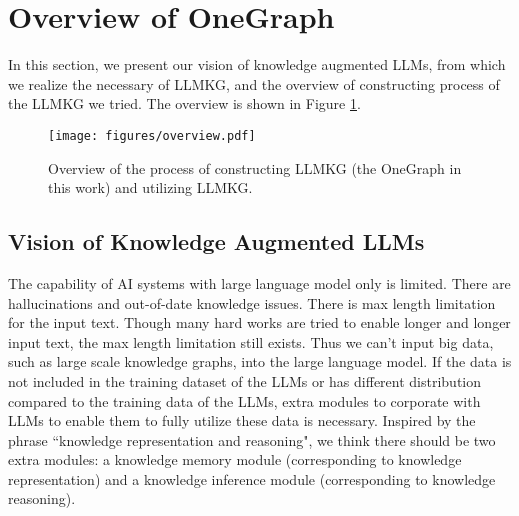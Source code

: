 \section{Overview of OneGraph}
In this section, we present our vision of knowledge augmented LLMs, from which we realize the necessary of LLMKG,  and the overview of constructing process of the LLMKG we tried. The overview is shown in Figure \ref{fig:overview}. 

\begin{figure}
    \centering
    \texttt{[image: figures/overview.pdf]}
    \caption{Overview of the process of constructing LLMKG (the OneGraph in this work) and utilizing LLMKG.}
    \label{fig:overview}
\end{figure}

\subsection{Vision of Knowledge Augmented LLMs}
The capability of AI systems with large language model only is limited. There are hallucinations and  out-of-date knowledge issues. There is max length limitation for the input text. Though many hard works are tried to enable longer and longer input text, the max length limitation still exists. Thus we can't input big data, such as large scale knowledge graphs, into the large language model. If the data is not included in the training dataset of the LLMs or has different distribution compared to the training data of the LLMs, extra modules to corporate with LLMs to enable them to fully utilize these data is necessary. Inspired by the phrase ``knowledge representation and reasoning", we think there should be two extra modules: a knowledge memory module (corresponding to knowledge representation) and a knowledge inference module (corresponding to knowledge reasoning). 
